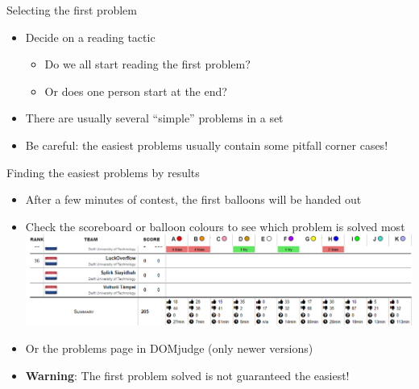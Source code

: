 \documentclass[11pt,pdf, aspectratio=169]{beamer}
\begin{document}
  \begin{frame}{Selecting the first problem}
    \begin{itemize}
      \item Decide on a reading tactic
      \begin{itemize}
        \item Do we all start reading the first problem?
        \item Or does one person start at the end?
      \end{itemize}
      \item There are usually several ``simple'' problems in a set
      \item Be careful: the easiest problems usually contain some pitfall corner cases!
    \end{itemize}
  \end{frame}
  \begin{frame}{Finding the easiest problems by results}
    \begin{itemize}
      \item After a few minutes of contest, the first balloons will be handed out
      \item Check the scoreboard or balloon colours to see which problem is solved most\\
      \includegraphics[width=\linewidth]{images/session-2/bottom-scoreboard}
      \item Or the problems page in DOMjudge (only newer versions)
      \item \textbf{Warning}: The first problem solved is not guaranteed the easiest!
    \end{itemize}
  \end{frame}
\end{document}
